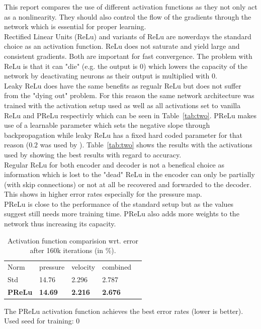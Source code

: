 \documentclass[acmtog]{techreportacmart}
\begin{document}
This report compares the use of different activation functions as they not only act as a nonlinearity. They should also control the flow of the gradients through the network which is essential for proper learning.\\
Rectified Linear Units (ReLu) and variants of ReLu are nowerdays the standard choice as an activation function. ReLu does not saturate and yield large and consistent gradients. Both are important for fast convergence. The problem with ReLu is that it can "die" (e.g. the output is 0) which lowers the capacity of the network by deactivating neurons as their output is multiplied with 0.\\
Leaky ReLu does have the same benefits as regualr ReLu but does not suffer from the "dying out" problem. For this reason the same network architecture was trained with the activation setup \cite{Thuerey20} used as well as all activations set to vanilla ReLu and PReLu respectivly which can be seen in Table~\ref{tab:two}. PReLu makes use of a learnable parameter which sets the negative slope through backpropagation while leaky ReLu has a fixed hard coded parameter for that reason ($0.2$ was used by \cite{Thuerey20}). Table~\ref{tab:two} shows the results with the activations used by \cite{Thuerey20} showing the best results with regard to accuracy. \\
Regular ReLu for both encoder and decoder is not a benefical choice as information which is lost to the "dead" ReLu in the encoder can only be partially (with skip connections) or not at all be recovered and forwarded to the decoder. This shows in higher error rates especially for the pressure map. \\
PReLu is close to the performance of the standard setup but as the values suggest still needs more training time. PReLu also adds more weights to the network thus increasing its capacity. 

\begin{table}[h]
\caption{Activation function comparision wrt. error \\ after 160k iterations (in \%).}
\label{tab:three}
\begin{center}
\begin{tabular}{l|l|l|l|l}
  \toprule
  Norm   & pressure   &	velocity    & combined \\
  Std	 & 14.76	  & 2.296		&  2.787   \\
  \bf PReLu	 & \bf 14.69	  & \bf 2.216		& \bf 2.676	   \\
  \bottomrule
\end{tabular}
\end{center}
\bigskip\centering
\footnotesize The PReLu activation function achieves  
the best error rates (lower is better). \\
Used seed for training: $0$
\end{table}%
\end{document}
